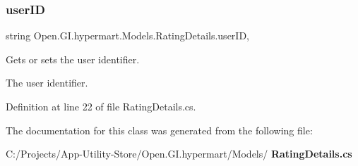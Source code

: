 \subsubsection{user\+ID}
{\footnotesize\ttfamily string Open.\+G\+I.\+hypermart.\+Models.\+Rating\+Details.\+user\+ID\hspace{0.3cm}{\ttfamily [get]}, {\ttfamily [set]}}



Gets or sets the user identifier. 

The user identifier. 

Definition at line 22 of file Rating\+Details.\+cs.



The documentation for this class was generated from the following file\+:\begin{DoxyCompactItemize}
\item 
C\+:/\+Projects/\+App-\/\+Utility-\/\+Store/\+Open.\+G\+I.\+hypermart/\+Models/\textbf{ Rating\+Details.\+cs}\end{DoxyCompactItemize}
